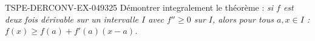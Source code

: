 \begin{exercice}{TSPE-DERCONV-EX-049}{3}{25}
Démontrer integralement le théorème : \emph{si $f$ est deux fois dérivable sur un intervalle $I$ avec $f'' \geq 0$ sur $I$, alors pour tous $a, x \in I$ : $f(x) \geq f(a) + f'(a)(x - a)$.}

\end{exercice}
